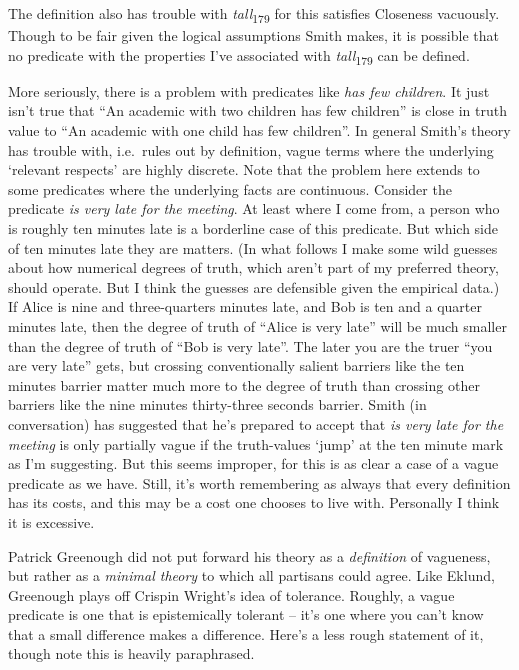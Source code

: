 \documentclass[
  10pt,
  letterpaper,
  DIV=11,
  numbers=noendperiod,
  twoside]{scrartcl}
\begin{document}
The definition also has trouble with \emph{tall}\textsubscript{179} for
this satisfies Closeness vacuously. Though to be fair given the logical
assumptions Smith makes, it is possible that no predicate with the
properties I've associated with \emph{tall}\textsubscript{179} can be
defined.

More seriously, there is a problem with predicates like \emph{has few
children}. It just isn't true that ``An academic with two children has
few children'' is close in truth value to ``An academic with one child
has few children''. In general Smith's theory has trouble with,
i.e.~rules out by definition, vague terms where the underlying `relevant
respects' are highly discrete. Note that the problem here extends to
some predicates where the underlying facts are continuous. Consider the
predicate \emph{is very late for the meeting}. At least where I come
from, a person who is roughly ten minutes late is a borderline case of
this predicate. But which side of ten minutes late they are matters. (In
what follows I make some wild guesses about how numerical degrees of
truth, which aren't part of my preferred theory, should operate. But I
think the guesses are defensible given the empirical data.) If Alice is
nine and three-quarters minutes late, and Bob is ten and a quarter
minutes late, then the degree of truth of ``Alice is very late'' will be
much smaller than the degree of truth of ``Bob is very late''. The later
you are the truer ``you are very late'' gets, but crossing
conventionally salient barriers like the ten minutes barrier matter much
more to the degree of truth than crossing other barriers like the nine
minutes thirty-three seconds barrier. Smith (in conversation) has
suggested that he's prepared to accept that \emph{is very late for the
meeting} is only partially vague if the truth-values `jump' at the ten
minute mark as I'm suggesting. But this seems improper, for this is as
clear a case of a vague predicate as we have. Still, it's worth
remembering as always that every definition has its costs, and this may
be a cost one chooses to live with. Personally I think it is excessive.

Patrick Greenough did not put forward his theory as a \emph{definition}
of vagueness, but rather as a \emph{minimal theory} to which all
partisans could agree. Like Eklund, Greenough plays off Crispin Wright's
idea of tolerance. Roughly, a vague predicate is one that is
epistemically tolerant -- it's one where you can't know that a small
difference makes a difference. Here's a less rough statement of it,
though note this is heavily paraphrased.
\end{document}
